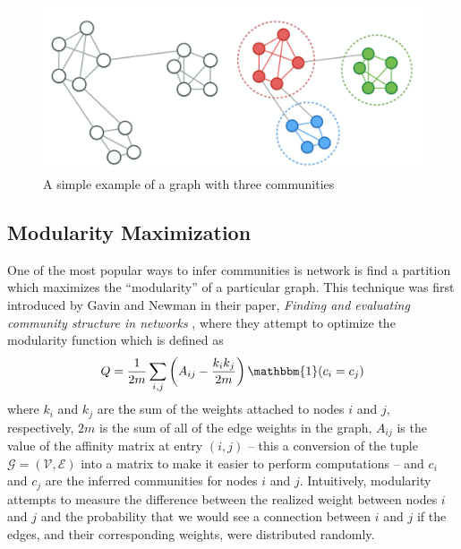 \documentclass[../thesis.tex]{subfiles}
\begin{document}
\begin{figure}
    \centering
    \includegraphics[width=.7\linewidth]{images/comm_detection.pdf}
    \caption[Simple Community Detection Example]{A simple example of a graph with three communities}
    \label{fig:simple_cd}
\end{figure}

\subsection{Modularity Maximization}
\label{modularity-max}
One of the most popular ways to infer communities is network is find a partition which maximizes the ``modularity'' of a particular graph. This technique was first introduced by Gavin and Newman in their paper, \textit{Finding and evaluating community structure in networks} \cite{newman2004finding}, where they attempt to optimize the modularity function which is defined as
\begin{equation}
    \label{eq:modularity}
    Q = \frac{1}{2m} \sum_{i,j} \left(A_{ij} - \frac{k_i k_j}{2m} \right)\mathbbm{1}(c_i = c_j)
\end{equation}
where $k_i$ and $k_j$ are the sum of the weights attached to nodes $i$ and $j$, respectively, $2m$ is the sum of all of the edge weights in the graph, $A_{ij}$ is the value of the affinity matrix at entry $(i, j)$ -- this a conversion of the tuple $\mathcal{G} = (\mathcal{V}, \mathcal{E})$ into a matrix to make it easier to perform computations -- and $c_i$ and $c_j$ are the inferred communities for nodes $i$ and $j$. Intuitively, modularity attempts to measure the difference between the realized weight between nodes $i$ and $j$ and the probability that we would see a connection between $i$ and $j$ if the edges, and their corresponding weights, were distributed randomly.
\end{document}

